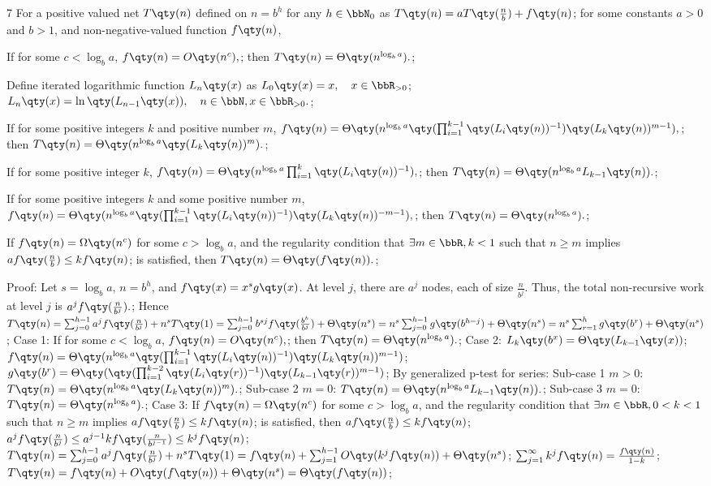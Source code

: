 \documentclass[a4paper,10pt]{extarticle}
\begin{document}
\begin{multicols}{7}
For a positive valued net $T\qty(n)$ defined on $n=b^h$ for any $h\in\bbN_0$ as
\(T\qty(n)=aT\qty(\frac{n}{b})+f\qty(n)\); 
for some constants $a>0$ and $b>1$, and non-negative-valued function $f\qty(n)$,

If for some $c<\log_ba$,
\(f\qty(n)=O\qty(n^c),\); 
then
\(T\qty(n)=\Theta\qty(n^{\log_ba}).\); 

Define iterated logarithmic function $L_n\qty(x)$ as
\(L_{0}\qty(x)=x,\quad x\in\bbR_{>0}\); 
\(L_{n}\qty(x)=\ln\qty(L_{n-1}\qty(x)),\quad n\in\bbN,x\in\bbR_{>0}.\); 

If for some positive integers $k$ and positive number $m$, 
\(f\qty(n)=\Theta\qty(n^{\log_ba}\qty(\prod_{i=1}^{k-1}\qty(L_{i}\qty(n))^{-1})\qty(L_{k}\qty(n))^{m-1}),\); 
then
\(T\qty(n)=\Theta\qty(n^{\log_ba}\qty(L_{k}\qty(n))^m).\); 

If for some positive integer $k$, 
\(f\qty(n)=\Theta\qty(n^{\log_ba}\prod_{i=1}^k\qty(L_{i}\qty(n))^{-1}),\); 
then
\(T\qty(n)=\Theta\qty(n^{\log_ba}L_{k-1}\qty(n)).\); 

If for some positive integers $k$ and some positive number $m$,
\(f\qty(n)=\Theta\qty(n^{\log_ba}\qty(\prod_{i=1}^{k-1}\qty(L_{i}\qty(n))^{-1})\qty(L_{k}\qty(n))^{-m-1}),\); 
then
\(T\qty(n)=\Theta\qty(n^{\log_ba}).\); 

If $f\qty(n)=\Omega\qty(n^c)$ for some $c>\log_ba$, and the regularity condition that $\exists m\in\bbR,k<1$ such that $n\ge m$ implies
\(af\qty(\frac{n}{b})\le kf\qty(n)\); 
is satisfied, then
\(T\qty(n)=\Theta\qty(f\qty(n)).\); 

Proof:
Let $s=\log_ba$, $n=b^h$, and $f\qty(x)=x^sg\qty(x)$. At level $j$, there are $a^j$ nodes, each of size $\frac{n}{b^j}$. Thus, the total non-recursive work at level $j$ is
\(a^jf\qty(\frac{n}{b^j}).\); 
Hence
\(
T\qty(n)=\sum_{j=0}^{h-1}a^jf\qty(\frac{n}{b^j})+n^sT\qty(1)
=\sum_{j=0}^{h-1}b^{sj}f\qty(\frac{b^h}{b^j})+\Theta\qty(n^s)
=n^s\sum_{j=0}^{h-1}g\qty(b^{h-j})+\Theta\qty(n^s)
=n^s\sum_{r=1}^hg\qty(b^r)+\Theta\qty(n^s)
\); 
Case 1: If for some $c<\log_ba$,
\(f\qty(n)=O\qty(n^c),\); 
then
\(T\qty(n)=\Theta\qty(n^{\log_ba}).\); 
Case 2:
\(L_{k}\qty(b^x)=\Theta\qty(L_{k-1}\qty(x))\); 
\(f\qty(n)=\Theta\qty(n^{\log_ba}\qty(\prod_{i=1}^{k-1}\qty(L_{i}\qty(n))^{-1})\qty(L_{k}\qty(n))^{m-1})\); 
\(g\qty(b^r)=\Theta\qty(\qty(\prod_{i=1}^{k-2}\qty(L_{i}\qty(r))^{-1})\qty(L_{k-1}\qty(r))^{m-1})\); 
By generalized p-test for series: Sub-case 1 $m>0$:
\(T\qty(n)=\Theta\qty(n^{\log_ba}\qty(L_{k}\qty(n))^m).\); 
Sub-case 2 $m=0$:
\(T\qty(n)=\Theta\qty(n^{\log_ba}L_{k-1}\qty(n)).\); 
Sub-case 3 $m=0$:
\(T\qty(n)=\Theta\qty(n^{\log_ba}).\); 
Case 3: If $f\qty(n)=\Omega\qty(n^c)$ for some $c>\log_ba$, and the regularity condition that $\exists m\in\bbR,0<k<1$ such that $n\ge m$ implies
\(af\qty(\frac{n}{b})\le kf\qty(n)\); 
is satisfied, then
\(af\qty(\frac{n}{b})\le kf\qty(n)\); 
\(a^jf\qty(\frac{n}{b^j})\le a^{j-1}kf\qty(\frac{n}{b^{j-1}})\le k^jf\qty(n)\); 
\(
T\qty(n)=\sum_{j=0}^{h-1}a^jf\qty(\frac{n}{b^j})+n^sT\qty(1)
=f\qty(n)+\sum_{j=1}^{h-1}O\qty(k^jf\qty(n))+\Theta\qty(n^s)
\); 
\(\sum_{j=1}^{\infty}k^jf\qty(n)=\frac{f\qty(n)}{1-k}\); 
\(T\qty(n)=f\qty(n)+O\qty(f\qty(n))+\Theta\qty(n^s)=\Theta\qty(f\qty(n))\); 


\end{multicols}
\end{document}
